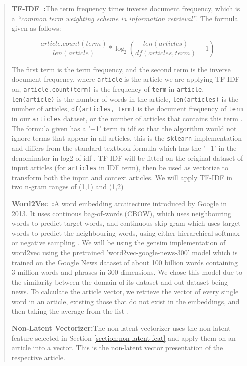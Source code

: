 \documentclass{article}
\begin{document}
\begin{quote}
  \textbf{TF-IDF~\cite{scikit-learn}:}\quad The term frequency times inverse document frequency, which is a \emph{``common term weighting scheme in information retrieval''}. The formula given as follows:

  \[\frac{article.count(term)}{len(article)} * \log_2{\left(\frac{len(articles)}{df(articles, term)} + 1\right)}\]

  The first term is the term frequency, and the second term is the inverse document frequency, where \texttt{article} is the article we are applying TF-IDF on, \texttt{article.count(term)} is the frequency of \texttt{term} in \texttt{article}, \texttt{len(article)} is the number of words in the article, \texttt{len(articles)} is the number of articles, \texttt{df(articles, term)} is the document frequency of \texttt{term} in our \texttt{articles} dataset, or the number of articles that contains this term  \cite{scikit-learn}. The formula given has a '+1' term in idf so that the algorithm would not ignore terms that appear in all articles, this is the \texttt{sklearn} implementation and differs from the standard textbook formula which has the '+1' in the denominator in log2 of idf  \cite{scikit-learn}. TF-IDF will be fitted on the original dataset of input articles (for \texttt{articles} in IDF term), then be used as vectorize to transform both the input and context articles. We will apply TF-IDF in two n-gram ranges of (1,1) and (1,2).

  \textbf{Word2Vec~\cite{word2vec-google}:}\quad A word embedding architecture introduced by Google in 2013. It uses continous bag-of-words (CBOW), which uses neighbouring words to predict target words, and continuous skip-gram which uses target words to predict the neighbouring words, using either hierarchical softmax or negative sampling \cite{gensim} \cite{mikolov2013efficient}. We will be using the gensim implementation of word2vec using the pretrained 'word2vec-google-news-300' model which is trained on the Google News dataset of about 100 billion words containing 3 million words and phrases in 300 dimensions. We chose this model due to the similarity between the domain of its dataset and out dataset being news. To calculate the article vector, we retrieve the vector of every single word in an article, existing those that do not exist in the embeddings, and then taking the average from the list \cite{alsuliman2022social}.

  \textbf{Non-Latent Vectorizer:}\quad The non-latent vectorizer uses the non-latent feature selected in Section \ref{section:non-latent-feat} and apply them on an article into a vector. This is the non-latent vector presentation of the respective article.
\end{quote}
\end{document}
